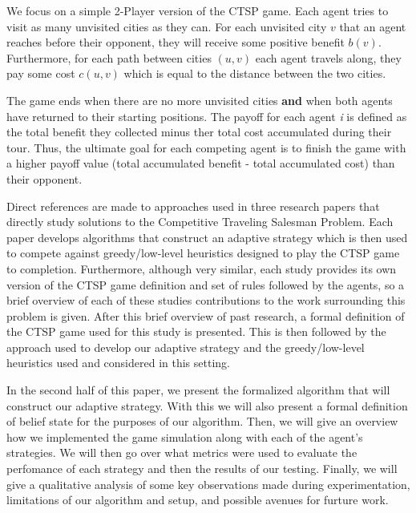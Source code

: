 \documentclass[pageno]{jpaper}
\begin{document}
We focus on a simple 2-Player version of the CTSP game. Each agent tries to visit as many unvisited cities as they can. For each unvisited city $v$ that an agent reaches before their opponent, they will receive some  positive benefit $b(v)$. Furthermore, for each path between cities $(u,v)$ each agent travels along, they pay some cost $c(u,v)$ which is equal to the distance between the two cities.\par

The game ends when there are no more unvisited cities \textbf{and} when both agents have returned to their starting positions. The payoff for each agent \textit{i} is defined as the total benefit they collected minus ther total cost accumulated during their tour. Thus, the ultimate goal for each competing agent is to finish the game with a higher payoff value (total accumulated benefit - total accumulated cost) than their opponent.\par

Direct references are made to approaches used in three research papers that directly study solutions to the Competitive Traveling Salesman Problem. Each paper develops algorithms that construct an adaptive strategy which is then used to compete against greedy/low-level heuristics designed to play the CTSP game to completion. Furthermore, although very similar, each study provides its own version of the CTSP game definition and set of rules followed by the agents, so a brief overview of each of these studies contributions to the work surrounding this problem is given. After this brief overview of past research, a formal definition of the CTSP game used for this study is presented. This is then followed by the approach used to develop our adaptive strategy and the greedy/low-level heuristics used and considered in this setting.\par

In the second half of this paper, we present the formalized algorithm that will construct our adaptive strategy. With this we will also present a formal definition of belief state for the purposes of our algorithm. Then, we will give an overview how we implemented the game simulation along with each of the agent's strategies. We will then go over what metrics were used to evaluate the perfomance of each strategy and then the results of our testing. Finally, we will give a qualitative analysis of some key observations made during experimentation, limitations of our algorithm and setup, and possible avenues for furture work.\newline
\end{document}
